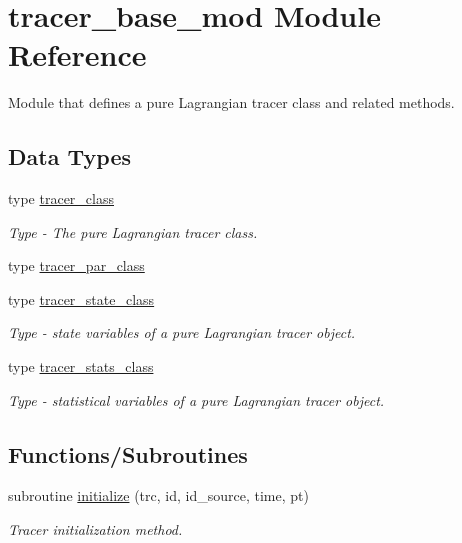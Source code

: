 \hypertarget{namespacetracer__base__mod}{}\section{tracer\+\_\+base\+\_\+mod Module Reference}
\label{namespacetracer__base__mod}


Module that defines a pure Lagrangian tracer class and related methods.  


\subsection*{Data Types}
\begin{DoxyCompactItemize}
\item 
type \hyperlink{structtracer__base__mod_1_1tracer__class}{tracer\+\_\+class}
\begin{DoxyCompactList}\small\item\em Type -\/ The pure Lagrangian tracer class. \end{DoxyCompactList}\item 
type \hyperlink{structtracer__base__mod_1_1tracer__par__class}{tracer\+\_\+par\+\_\+class}
\item 
type \hyperlink{structtracer__base__mod_1_1tracer__state__class}{tracer\+\_\+state\+\_\+class}
\begin{DoxyCompactList}\small\item\em Type -\/ state variables of a pure Lagrangian tracer object. \end{DoxyCompactList}\item 
type \hyperlink{structtracer__base__mod_1_1tracer__stats__class}{tracer\+\_\+stats\+\_\+class}
\begin{DoxyCompactList}\small\item\em Type -\/ statistical variables of a pure Lagrangian tracer object. \end{DoxyCompactList}\end{DoxyCompactItemize}
\subsection*{Functions/\+Subroutines}
\begin{DoxyCompactItemize}
\item 
subroutine \hyperlink{namespacetracer__base__mod_ae73e3d1fd8818cf3e1a8593aafebea43}{initialize} (trc, id, id\+\_\+source, time, pt)
\begin{DoxyCompactList}\small\item\em Tracer initialization method. \end{DoxyCompactList}\end{DoxyCompactItemize}

